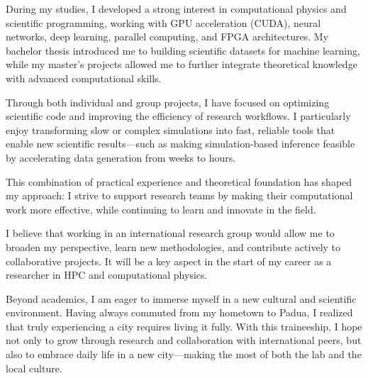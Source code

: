 \documentclass[a4paper,11pt]{article}
\begin{document}
During my studies, I developed a strong interest in computational physics and scientific programming, working with GPU acceleration (CUDA), neural networks, deep learning, parallel computing, and FPGA architectures. My bachelor thesis introduced me to building scientific datasets for machine learning, while my master’s projects allowed me to further integrate theoretical knowledge with advanced computational skills.

Through both individual and group projects, I have focused on optimizing scientific code and improving the efficiency of research workflows. I particularly enjoy transforming slow or complex simulations into fast, reliable tools that enable new scientific results—such as making simulation-based inference feasible by accelerating data generation from weeks to hours.

This combination of practical experience and theoretical foundation has shaped my approach: I strive to support research teams by making their computational work more effective, while continuing to learn and innovate in the field.


I believe that working in an international research group would allow me to broaden my perspective, learn new methodologies, and contribute actively to collaborative projects. It will be a key aspect in the start of my career as a researcher in HPC and computational physics.

Beyond academics, I am eager to immerse myself in a new cultural and scientific environment. Having always commuted from my hometown to Padua, I realized that truly experiencing a city requires living it fully. With this traineeship, I hope not only to grow through research and collaboration with international peers, but also to embrace daily life in a new city—making the most of both the lab and the local culture.
\end{document}

